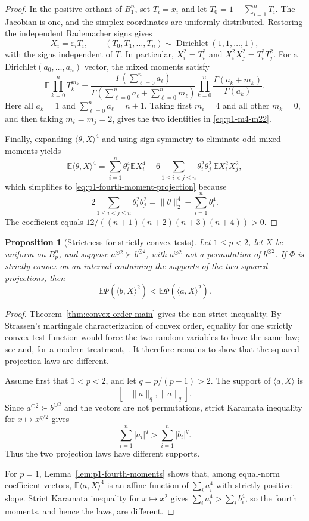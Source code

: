 \documentclass[pdflatex,sn-mathphys-num]{sn-jnl}
\numberwithin{equation}{section}
\theoremstyle{thmstyleone}
\newtheorem{proposition}[theorem]{Proposition}
\theoremstyle{thmstylethree}
\newcommand{\E}{\mathbb{E}}
\newcommand{\1}{\mathbf{1}}
\newcommand{\eps}{\varepsilon}
\newcommand{\sqvec}[1]{#1^{\odot 2}}
\begin{document}
\begin{proof}
In the positive orthant of $B_1^n$, set $T_i=x_i$ and let $T_0=1-\sum_{i=1}^n T_i$. The Jacobian is one, and the simplex coordinates are uniformly distributed. Restoring the independent Rademacher signs gives
\[
 X_i=\eps_i T_i,
 \qquad
 (T_0,T_1,\ldots,T_n)\sim \operatorname{Dirichlet}(1,1,\ldots,1),
\]
with the signs independent of $T$. In particular, $X_i^2=T_i^2$ and $X_i^2X_j^2=T_i^2T_j^2$.
For a Dirichlet$(a_0,\ldots,a_n)$ vector, the mixed moments satisfy
\[
 \E\prod_{k=0}^n T_k^{m_k}
 =
 \frac{\Gamma(\sum_{\ell=0}^n a_\ell)}{\Gamma(\sum_{\ell=0}^n a_\ell+\sum_{\ell=0}^n m_\ell)}
 \prod_{k=0}^n\frac{\Gamma(a_k+m_k)}{\Gamma(a_k)}.
\]
Here all $a_k=1$ and $\sum_{\ell=0}^n a_\ell=n+1$. Taking first $m_i=4$ and all other $m_k=0$, and then taking $m_i=m_j=2$, gives the two identities in \eqref{eq:p1-m4-m22}.

Finally, expanding $\langle\theta,X\rangle^4$ and using sign symmetry to eliminate odd mixed moments yields
\[
 \E\langle\theta,X\rangle^4
 =\sum_{i=1}^n\theta_i^4 \E X_i^4
 +6\sum_{1\le i<j\le n}\theta_i^2\theta_j^2\,\E X_i^2X_j^2,
\]
which simplifies to \eqref{eq:p1-fourth-moment-projection} because
\[
 2\sum_{1\le i<j\le n}\theta_i^2\theta_j^2
 =\|\theta\|_2^4-\sum_{i=1}^n\theta_i^4.
\]
The coefficient equals $12/((n+1)(n+2)(n+3)(n+4))>0$.
\end{proof}


\begin{proposition}[Strictness for strictly convex tests]\label{prop:strict-convex-tests}
Let $1\le p<2$, let $X$ be uniform on $B_p^n$, and suppose
$\sqvec a\succ\sqvec b$, with $\sqvec a$ not a permutation of
$\sqvec b$. If $\Phi$ is strictly convex on an interval containing the
supports of the two squared projections, then
\[
 \E\Phi(\langle b,X\rangle^2)
 <
 \E\Phi(\langle a,X\rangle^2).
\]
\end{proposition}

\begin{proof}
Theorem~\ref{thm:convex-order-main} gives the non-strict inequality.
By Strassen's martingale characterization of convex order, equality for
one strictly convex test function would force the two random variables
to have the same law; see \cite{Strassen} and, for a modern treatment,
\cite[Ch.~3.A]{ShakedShanthikumar}. It therefore remains to show that
the squared-projection laws are different.

Assume first that $1<p<2$, and let $q=p/(p-1)>2$. The support of
$\langle a,X\rangle$ is
\[
 [-\|a\|_q,\|a\|_q].
\]
Since $\sqvec a\succ\sqvec b$ and the vectors are not permutations,
strict Karamata inequality for $x\mapsto x^{q/2}$ gives
\[
 \sum_{i=1}^n |a_i|^q
 >
 \sum_{i=1}^n |b_i|^q.
\]
Thus the two projection laws have different supports.

For $p=1$, Lemma~\ref{lem:p1-fourth-moments} shows that, among
equal-norm coefficient vectors,
$\E\langle a,X\rangle^4$ is an affine function of
$\sum_i a_i^4$ with strictly positive slope. Strict Karamata inequality
for $x\mapsto x^2$ gives
$\sum_i a_i^4>\sum_i b_i^4$, so the fourth moments, and hence the laws,
are different.
\end{proof}
\end{document}
